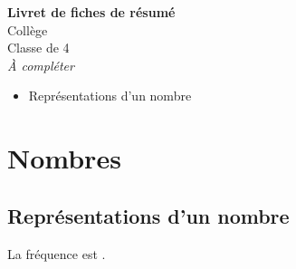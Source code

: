 \documentclass[a4paper,11pt,twoside]{article}
\providecommand{\acompleter}[1]{\;\underline{\phantom{#1}}\;}
\begin{document}
\providecommand{\theHExoNum}{\theExoNum}
\providecommand{\theHNotionNum}{\theNotionNum}
\providecommand{\theHMethodeNum}{\theMethodeNum}

\seqCreeCompteurs
{}

\thispagestyle{empty}
\begin{center}
\vspace*{2em}
{\Huge\bfseries Livret de fiches de résumé}\\[2em]
{\Large Collège}\\[1em]
{\LARGE Classe de 4\ieme{}}\\[1em]
{\large \emph{À compléter}}\\[3em]
\end{center}

\begin{itemize}
  \item Représentations d'un nombre
\end{itemize}

\newpage

\thispagestyle{empty}
\tableofcontents
\newpage

\cleardoublepage
{}
\section{Nombres}

\subsection{Représentations d'un nombre}

\begin{seqBoiteContenuFlashcard}[titre=Définition]
La fréquence est \acompleter{n/N}.
\end{seqBoiteContenuFlashcard}
\begin{seqBoiteFillContenuFlashcard}\end{seqBoiteFillContenuFlashcard}
\end{document}
